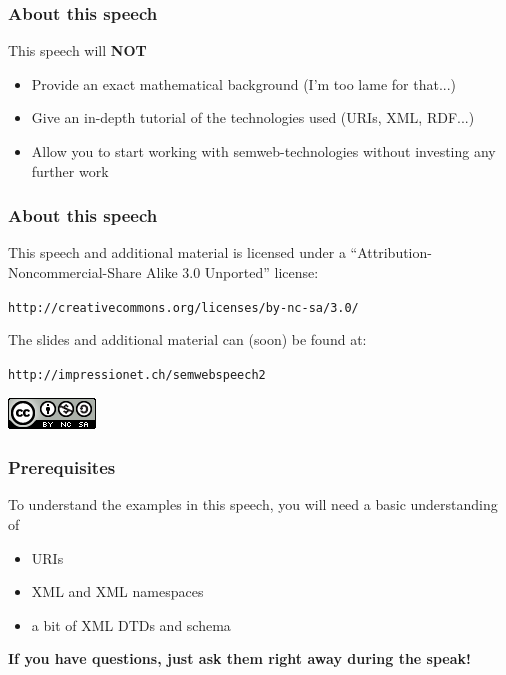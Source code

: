 \documentclass{beamer}
\begin{document}
        \begin{frame}
            \frametitle{About this speech}

            This speech will \textbf{NOT}
            \vskip 0.7cm
            \pause

            \begin{itemize}
                \item Provide an exact mathematical background (I'm too lame for that...)
                \pause
                \item Give an in-depth tutorial of the technologies used (URIs, XML, RDF...)
                \pause
                \item Allow you to start working with semweb-technologies without investing any further work
            \end{itemize}
        \end{frame}

        \begin{frame}
            \frametitle{About this speech}

            This speech and additional material is licensed under a ``Attribution-Noncommercial-Share Alike 3.0 Unported'' license:
            \vskip 0.4cm

            \texttt{http://creativecommons.org/licenses/by-nc-sa/3.0/}
            \vskip 0.7cm

            The slides and additional material can (soon) be found at:
            \vskip 0.4cm

            \texttt{http://impressionet.ch/semwebspeech2}
            \vskip 2cm

            \begin{center}
                \includegraphics[scale=0.5]{somerights}
            \end{center}
        \end{frame}

        \begin{frame}
            \frametitle{Prerequisites}

            To understand the examples in this speech, you will need a basic understanding of
            \vskip 0.7cm
            \pause

            \begin{itemize}
                \item URIs 
                \pause
                \item XML and XML namespaces
                \pause
                \item a bit of XML DTDs and schema
                \pause
            \end{itemize}
            \vskip 0.7cm
            \textbf{If you have questions, just ask them right away during the speak!}

        \end{frame}
\end{document}

